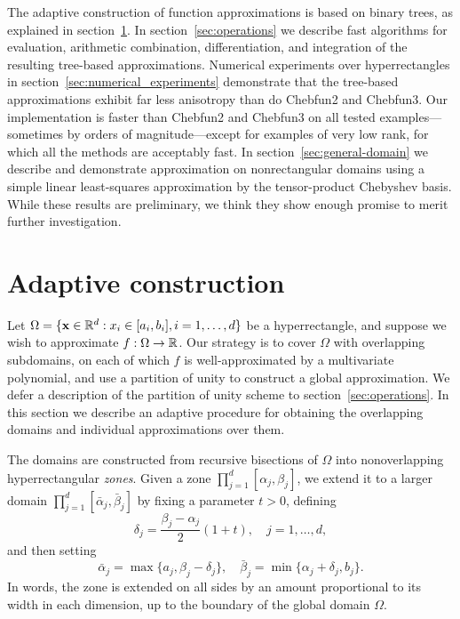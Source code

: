 The adaptive construction of function approximations is based on binary trees, as explained in section~\ref{sec:construction}. In section~\ref{sec:operations} we describe fast algorithms for evaluation, arithmetic combination, differentiation, and integration of the resulting tree-based approximations. Numerical experiments over hyperrectangles in section~\ref{sec:numerical_experiments} demonstrate that the tree-based approximations exhibit far less anisotropy than do Chebfun2 and Chebfun3. Our implementation is faster than Chebfun2 and Chebfun3 on all tested examples---sometimes by orders of magnitude---except for examples of very low rank, for which all the methods are acceptably fast. In section~\ref{sec:general-domain} we describe and demonstrate approximation on nonrectangular domains using a simple linear least-squares approximation by the tensor-product Chebyshev basis. While these results are preliminary, we think they show enough promise to merit further investigation. 



\section{Adaptive construction}
\label{sec:construction}

Let $\Omega = \{ \mathbf{x} \in \mathbb{R}^d: x_i \in [a_i,b_i], i=1,\ldots,d\}$ be a hyperrectangle, and suppose we wish to approximate $f:\Omega \to \mathbb{R}$. Our strategy is to cover $\Omega$ with overlapping subdomains, on each of which $f$ is well-approximated by a multivariate polynomial, and use a partition of unity to construct a global approximation. We defer a description of the partition of unity scheme to section~\ref{sec:operations}. In this section we describe an adaptive procedure for obtaining the overlapping domains and individual approximations over them. 

The domains are constructed from recursive bisections of $\Omega$ into nonoverlapping hyperrectangular \emph{zones}. Given a zone $\prod_{j=1}^d [\alpha_{j},\beta_{j}]$, we extend it to a larger domain $\prod_{j=1}^d [\bar{\alpha}_{j},\bar{\beta}_{j}]$ by fixing a parameter $t>0$, defining
\begin{equation}
  \label{eq:overlap}
  \delta_{j} =  \frac{\beta_{j}-\alpha_{j}}{2}(1+t),\quad j=1,\ldots,d,
\end{equation}
and then setting
\begin{equation}
  \bar{\alpha}_{j} = \max\{a_j,\beta_{j}-\delta_{j}\}, \quad \bar{\beta}_{j} = \min\{\alpha_{j}+\delta_{j},b_j\}.
  \label{eq:zone_extend}
\end{equation}
In words, the zone is extended on all sides by an amount proportional to its width in each dimension, up to the boundary of the global domain $\Omega$. 


